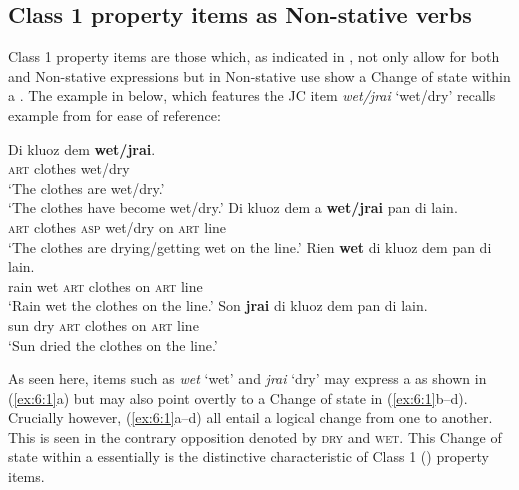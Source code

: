 \subsection{Class 1 property items as Non-stative verbs}\label{sec:6.1.1}

Class 1 property items are those which, as indicated in , not only allow for both  and Non-stative expressions but in Non-stative use show a Change of state within a . The example in  below, which features the JC item \textit{wet\slash jrai}  `wet\slash dry’ recalls example  from  for ease of reference: 

\ea%
\label{ex:6:1}
 \ea
 \gll      Di kluoz    dem \textbf{wet/jrai}.\\
 \textsc{art} clothes {\PL}        wet/dry\\
 \ea `The clothes are wet/dry.'\\
 \ex `The clothes have become wet/dry.'
 \z
 \ex
 \gll     Di kluoz      dem         a \textbf{wet/jrai} pan          di lain.\\
 \textsc{art} clothes {\PL} \textsc{asp}       wet/dry    on \textsc{art} line\\
 \glt `The clothes are drying\slash getting wet on the line.'
 \ex
 \gll Rien \textbf{wet}        di kluoz       dem pan         di lain.\\
      rain         wet \textsc{art} clothes {\PL} on \textsc{art} line\\
 \glt `Rain wet the clothes on the line.'
 \ex 
 \gll Son \textbf{jrai}         di kluoz      dem pan         di lain.\\
      sun          dry \textsc{art} clothes {\PL} on \textsc{art} line\\
 \glt `Sun dried the clothes on the line.'
 \z
\z


As seen here, items such as \textit{wet} `wet' and \textit{jrai} `dry' may express a  as shown in (\ref{ex:6:1}a) but may also point overtly to a Change of state in (\ref{ex:6:1}b--d). Crucially however, (\ref{ex:6:1}a--d) all entail a logical change from one  to another. This is seen in the contrary opposition denoted by \textsc{dry} and \textsc{wet}. This Change of state within a  essentially is the distinctive characteristic of Class 1 () property items. 


